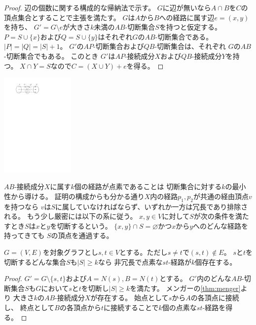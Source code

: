 \begin{paracol}{2}
\begin{proof}
辺の個数に関する構成的な帰納法で示す。
$G$に辺が無いなら$A \cap B$を$C$の頂点集合とすることで主張を満たす。
$G$は$A$から$B$への経路に属す辺$e=(x, y)$を持ち、
$G' = G \setminus e$が大きさ$k$未満の$AB$-切断集合$S$を持つと仮定する。
$P=S\cup\{x\}$および$Q=S\cup\{y\}$はそれぞれ$G$の$AB$-切断集合である。
$|P|=|Q|=|S|+1$。
$G'$の$AP$-切断集合および$QB$-切断集合は、それぞれ
$G$の$AB$-切断集合でもある。
このとき
$G'$は$AP$-接続成分$X$および$QB$-接続成分$Y$を持つ。
$X\cap Y=S$なので$C=(X\cup Y) + e$を得る。
\end{proof}

\switchcolumn
\vspace{0.5\intextsep}
\centering
\includegraphics[width=0.27\textwidth]{figures/menger_goring_proof.pdf}
\end{paracol}

$AB$-接続成分$X$に属す$k$個の経路が点素であることは
切断集合に対する$k$の最小性から導ける。
証明の構成からも分かる通り$X$内の経路$p_1, p_2$が共通の経由頂点$v$を持つなら
$v$は$S$に属していなければならず、いずれか一方は冗長であり排除される。
もう少し厳密には以下の系に従う。
$x, y \in V$に対して$S$が次の条件を満たすとき$S$は$x$と$y$を切断するという。
$\{x, y\}\cap S = \varnothing$かつ$x$から$y$へのどんな経路を持ってきても
$S$の頂点を通過する。

\begin{corollary}
\label{coro:pairwise_independent}
$G=(V,E)$を対象グラフとし$s,t\in V$とする。ただし$s \neq t$で$(s, t) \notin E$。
$s$と$t$を切断するどんな集合$S$も$|S|\geq k$なら
非冗長で点素な$st$-経路が$k$個存在する。
\end{corollary}
\begin{proof}
$G'=G\setminus\{s,t\}$および$A=N(s), B=N(t)$とする。
$G'$内のどんな$AB$-切断集合$S$も$G$において$s$と$t$を切断し$|S|\geq k$を満たす。
メンガーの\cref{thm:menger}より
大きさ$k$の$AB$-接続成分$X$が存在する。
始点として$s$から$A$の各頂点に接続し、
終点として$B$の各頂点から$t$に接続することで$k$個の点素な$st$-経路を得る。
\end{proof}






